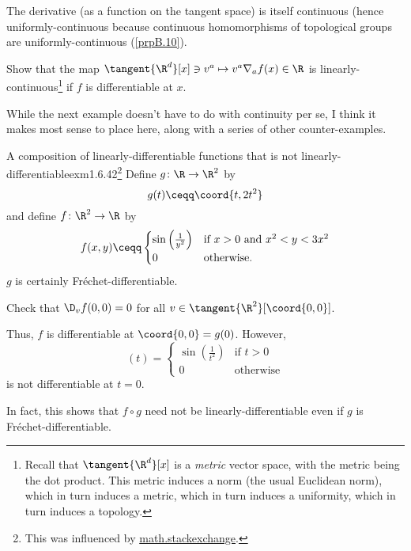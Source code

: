 The derivative (as a function on the tangent space) is itself continuous (hence uniformly-continuous because continuous homomorphisms of topological groups are uniformly-continuous (\cref{prpB.10}).
\begin{exr}{}{}
Show that the map $\tangent{\R ^d}[x]\ni v^a\mapsto v^a\nabla _af(x)\in \R$ is linearly-continuous\footnote{Recall that $\tangent{\R ^d}[x]$ is a \emph{metric} vector space, with the metric being the dot product.  This metric induces a norm (the usual Euclidean norm), which in turn induces a metric, which in turn induces a uniformity, which in turn induces a topology.} if $f$ is differentiable at $x$.
\end{exr}

While the next example doesn't have to do with continuity per se, I think it makes most sense to place here, along with a series of other counter-examples.
\begin{exm}{A composition of linearly-diff\-er\-en\-tia\-ble functions that is not linearly-differentiable}{exm1.6.42}\footnote{This was influenced by \href{https://math.stackexchange.com/questions/705847/counterexample-for-the-chain-rule-for-the-gateaux-derivative}{math.stackexchange}.}
	Define $g\colon \R \rightarrow \R ^2$ by
	\begin{equation}
		g(t)\ceqq \coord{t,2t^2}
	\end{equation}
	and define $f\colon \R ^2\rightarrow \R$ by
	\begin{equation}
		f(x,y)\ceqq \begin{cases}\sin \left( \tfrac{1}{y^2}\right) & \text{if }x>0\text{ and }x^2<y<3x^2 \\ 0 & \text{otherwise.}\end{cases}
	\end{equation}
	$g$ is certainly Fréchet-differentiable.
	\begin{exr}[breakable=false]{}{}
		Check that $\D _vf(0,0)=0$ for all $v\in \tangent{\R ^2}[\coord{0,0}]$.
	\end{exr}
	Thus, $f$ is differentiable at $\coord{0,0}=g(0)$.  However,
	\begin{equation}
		[f\circ g](t)=\begin{cases}\sin \left( \tfrac{1}{t^2}\right) & \text{if }t>0 \\ 0 & \text{otherwise}\end{cases}
	\end{equation}
	is not differentiable at $t=0$.
	\begin{rmk}
		In fact, this shows that $f\circ g$ need not be linearly-differentiable even if $g$ is Fréchet-differentiable.
	\end{rmk}
\end{exm}
